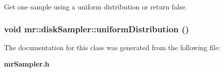 Get one sample using a uniform distribution or return false. 

\subsubsection{\setlength{\rightskip}{0pt plus 5cm}void mr::disk\-Sampler::uniform\-Distribution ()\hspace{0.3cm}{\tt  [inline, protected]}}\label{classmr_1_1diskSampler_b1}




The documentation for this class was generated from the following file:\begin{CompactItemize}
\item 
{\bf mr\-Sampler.h}\end{CompactItemize}
